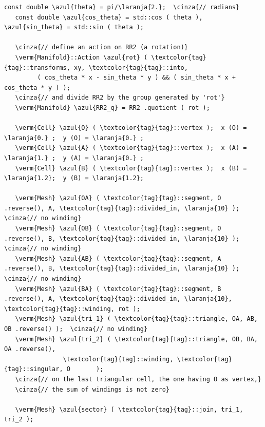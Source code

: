 \begin{Verbatim}[commandchars=\\\{\},formatcom=\small\tt,frame=single,
   label=parag-\ref{\numb section 7.\numb parag 15}.cpp,rulecolor=\color{moldura},
   baselinestretch=0.94,framesep=2mm                                             ]
   const double \azul{theta} = pi/\laranja{2.};  \cinza{// radians}
   const double \azul{cos_theta} = std::cos ( theta ), \azul{sin_theta} = std::sin ( theta );
	
   \cinza{// define an action on RR2 (a rotation)}
   \verm{Manifold}::Action \azul{rot} ( \textcolor{tag}{tag}::transforms, xy, \textcolor{tag}{tag}::into,
         ( cos_theta * x - sin_theta * y ) && ( sin_theta * x + cos_theta * y ) );
   \cinza{// and divide RR2 by the group generated by 'rot'}
   \verm{Manifold} \azul{RR2_q} = RR2 .quotient ( rot );

   \verm{Cell} \azul{O} ( \textcolor{tag}{tag}::vertex );  x (O) = \laranja{0.} ;  y (O) = \laranja{0.} ;
   \verm{Cell} \azul{A} ( \textcolor{tag}{tag}::vertex );  x (A) = \laranja{1.} ;  y (A) = \laranja{0.} ;
   \verm{Cell} \azul{B} ( \textcolor{tag}{tag}::vertex );  x (B) = \laranja{1.2};  y (B) = \laranja{1.2};

   \verm{Mesh} \azul{OA} ( \textcolor{tag}{tag}::segment, O .reverse(), A, \textcolor{tag}{tag}::divided_in, \laranja{10} );  \cinza{// no winding}
   \verm{Mesh} \azul{OB} ( \textcolor{tag}{tag}::segment, O .reverse(), B, \textcolor{tag}{tag}::divided_in, \laranja{10} );  \cinza{// no winding}
   \verm{Mesh} \azul{AB} ( \textcolor{tag}{tag}::segment, A .reverse(), B, \textcolor{tag}{tag}::divided_in, \laranja{10} );  \cinza{// no winding}
   \verm{Mesh} \azul{BA} ( \textcolor{tag}{tag}::segment, B .reverse(), A, \textcolor{tag}{tag}::divided_in, \laranja{10}, \textcolor{tag}{tag}::winding, rot );
   \verm{Mesh} \azul{tri_1} ( \textcolor{tag}{tag}::triangle, OA, AB, OB .reverse() );  \cinza{// no winding}
   \verm{Mesh} \azul{tri_2} ( \textcolor{tag}{tag}::triangle, OB, BA, OA .reverse(),
                \textcolor{tag}{tag}::winding, \textcolor{tag}{tag}::singular, O       );
   \cinza{// on the last triangular cell, the one having O as vertex,}
   \cinza{// the sum of windings is not zero}

   \verm{Mesh} \azul{sector} ( \textcolor{tag}{tag}::join, tri_1, tri_2 );
\end{Verbatim}

